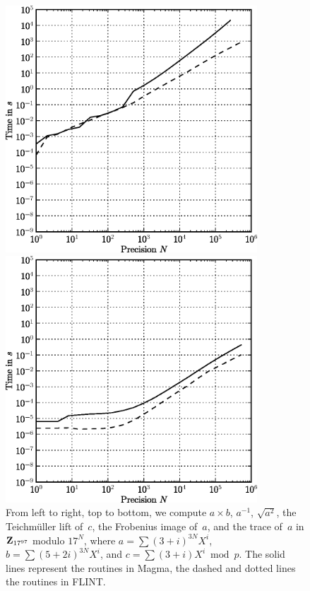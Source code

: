 \begin{figure}[ht]
\begin{minipage}[b]{0.5\linewidth}
\centering
\includegraphics[width=0.84\textwidth]{bin/qq-frobenius}
\end{minipage}
\begin{minipage}[b]{0.5\linewidth}
\centering
\includegraphics[width=0.84\textwidth]{bin/qq-trace}
\end{minipage}
\caption{From left to right, top to bottom, we compute 
$a \times b$, $a^{-1}$, $\sqrt{a^2}$, the Teichm\"uller lift of~$c$, 
the Frobenius image of~$a$, and the trace of~$a$ in $\mathbf{Z}_{17^{97}}$ 
modulo $17^N$, where $a = \sum (3+i)^{3N} X^i$, $b = \sum (5+2i)^{3N} X^i$, 
and $c = \sum (3+i) X^i \bmod p$.
The solid lines represent the routines in {\sc Magma}, the dashed 
and dotted lines the routines in {\sc FLINT}.}
\label{fig:timings-qq1}
\end{figure}

